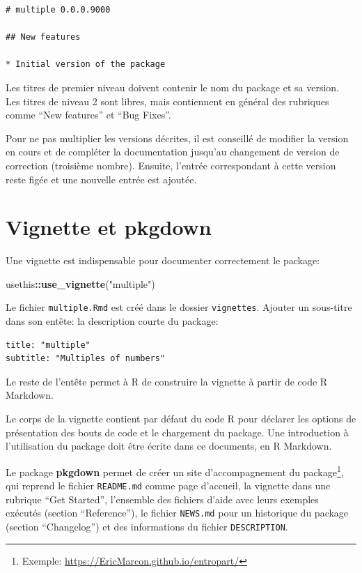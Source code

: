 \documentclass[
  12pt,
  french,
  a4paper,
  extrafontsizes,onecolumn,openright
  ]{memoir}
\newenvironment{Shaded}{\begin{snugshade}}{\end{snugshade}}
\newcommand{\KeywordTok}[1]{\textcolor[rgb]{0.13,0.29,0.53}{\textbf{#1}}}
\newcommand{\NormalTok}[1]{#1}
\newcommand{\OperatorTok}[1]{\textcolor[rgb]{0.81,0.36,0.00}{\textbf{#1}}}
\newcommand{\StringTok}[1]{\textcolor[rgb]{0.31,0.60,0.02}{#1}}
\begin{document}
\begin{verbatim}
# multiple 0.0.0.9000

## New features

* Initial version of the package
\end{verbatim}

Les titres de premier niveau doivent contenir le nom du package et sa version.
Les titres de niveau 2 sont libres, mais contiennent en général des rubriques comme \enquote{New features} et \enquote{Bug Fixes}.

Pour ne pas multiplier les versions décrites, il est conseillé de modifier la version en cours et de compléter la documentation jusqu'au changement de version de correction (troisième nombre).
Ensuite, l'entrée correspondant à cette version reste figée et une nouvelle entrée est ajoutée.

\hypertarget{vignette-et-pkgdown}{%
\section{Vignette et pkgdown}\label{vignette-et-pkgdown}}

Une vignette est indispensable pour documenter correctement le package:

\scriptsize

\begin{Shaded}
\begin{Highlighting}[]
\NormalTok{usethis}\OperatorTok{::}\KeywordTok{use_vignette}\NormalTok{(}\StringTok{"multiple"}\NormalTok{)}
\end{Highlighting}
\end{Shaded}

\normalsize

Le fichier \texttt{multiple.Rmd} est créé dans le dossier \texttt{vignettes}.
Ajouter un sous-titre dans son entête: la description courte du package:

\begin{verbatim}
title: "multiple"
subtitle: "Multiples of numbers"
\end{verbatim}

Le reste de l'entête permet à R de construire la vignette à partir de code R Markdown.

Le corps de la vignette contient par défaut du code R pour déclarer les options de présentation des bouts de code et le chargement du package.
Une introduction à l'utilisation du package doit être écrite dans ce documents, en R Markdown.

Le package \textbf{pkgdown} permet de créer un site d'accompagnement du package\footnote{Exemple: \url{https://EricMarcon.github.io/entropart/}}, qui reprend le fichier \texttt{README.md} comme page d'accueil, la vignette dans une rubrique \enquote{Get Started}, l'ensemble des fichiers d'aide avec leurs exemples exécutés (section \enquote{Reference}), le fichier \texttt{NEWS.md} pour un historique du package (section \enquote{Changelog}) et des informations du fichier \texttt{DESCRIPTION}.
\end{document}
